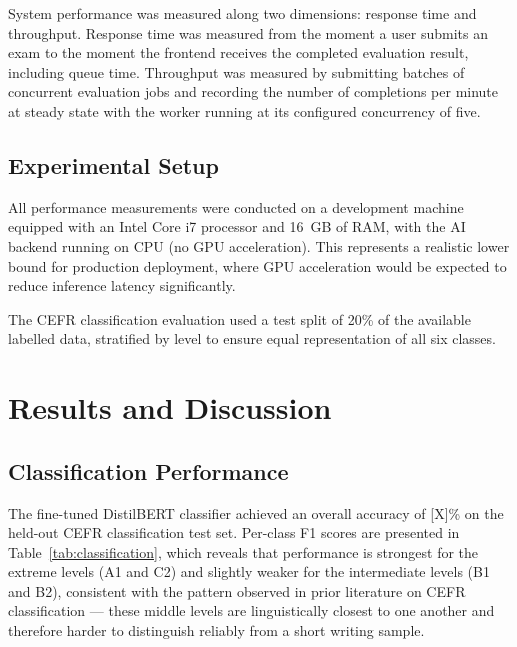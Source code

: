 \documentclass[12pt, a4paper]{report}
\begin{document}
System performance was measured along two dimensions: response time and throughput. Response time was measured from the moment a user submits an exam to the moment the frontend receives the completed evaluation result, including queue time. Throughput was measured by submitting batches of concurrent evaluation jobs and recording the number of completions per minute at steady state with the worker running at its configured concurrency of five.

\section{Experimental Setup}

All performance measurements were conducted on a development machine equipped with an Intel Core i7 processor and 16~GB of RAM, with the AI backend running on CPU (no GPU acceleration). This represents a realistic lower bound for production deployment, where GPU acceleration would be expected to reduce inference latency significantly.

The CEFR classification evaluation used a test split of 20\% of the available labelled data, stratified by level to ensure equal representation of all six classes.

\chapter{Results and Discussion}
\label{ch:results}

\section{Classification Performance}

The fine-tuned DistilBERT classifier achieved an overall accuracy of [X]\% on the held-out CEFR classification test set. Per-class F1 scores are presented in Table~\ref{tab:classification}, which reveals that performance is strongest for the extreme levels (A1 and C2) and slightly weaker for the intermediate levels (B1 and B2), consistent with the pattern observed in prior literature on CEFR classification — these middle levels are linguistically closest to one another and therefore harder to distinguish reliably from a short writing sample.
\end{document}
